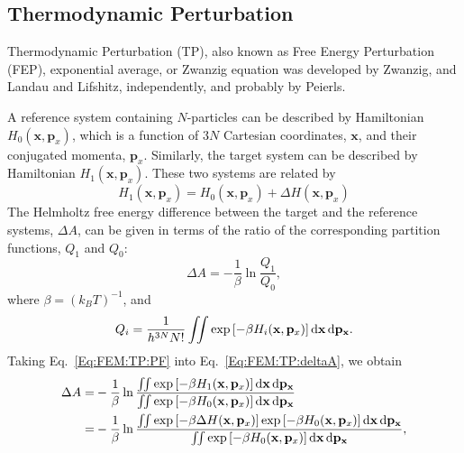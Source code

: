 \subsection{Thermodynamic Perturbation\label{Sec:FEM:TP}}
Thermodynamic Perturbation (TP), also known as Free Energy Perturbation (FEP), exponential average, or Zwanzig equation was developed by Zwanzig,\cite{ZwanzigJCP1954} and Landau and Lifshitz, independently, and probably by Peierls\cite{JorgensenJCTC2008}. 

A reference system containing $N$-particles can be described by Hamiltonian $H_{0}(\mathbf{x},\mathbf{p}_{x})$, which is a function of $3N$ Cartesian coordinates, $\mathbf{x}$, and their conjugated momenta, $\mathbf{p}_{x}$. Similarly, the target system can be described by Hamiltonian $H_{1}(\mathbf{x},\mathbf{p}_{x})$. These two systems are related by 
\begin{equation}
  H_{1}(\mathbf{x},\mathbf{p}_{x}) = H_{0}(\mathbf{x},\mathbf{p}_{x}) + \Delta H (\mathbf{x},\mathbf{p}_{x})
  \label{Eq:FEM:TP:deltaH}
\end{equation}
The Helmholtz free energy difference between the target and the reference systems, $\Delta A$, can be given in terms of the ratio of the corresponding partition functions, $Q_{1}$ and $Q_{0}$:
\begin{equation}
  \Delta A  =  -\frac{1}{\beta}\ln\frac{Q_{1}}{Q_{0}},
  \label{Eq:FEM:TP:deltaA}
\end{equation}
where $\beta = {(k_{B}T)}^{-1}$, and
\begin{equation}
  Q_i = \frac{1}{{h}^{3N}N!} \iint \exp\left[-\beta H_i(\mathbf{x},\mathbf{p}_{x})\right] \mathop{}\!\mathrm{d}\mathbf{x}\mathop{}\!\mathrm{d} \mathbf{p}_\mathbf{x}.
  \label{Eq:FEM:TP:PF}
\end{equation}
Taking Eq.~\ref{Eq:FEM:TP:PF} into Eq.~\ref{Eq:FEM:TP:deltaA}, we obtain
\begin{align}
  \Delta A  =&  -\frac{1}{\beta}\ln{\frac{\iint \exp\left[-\beta H_{1}(\mathbf{x},\mathbf{p}_{x})\right] \diff\mathbf{x}\diff\mathbf{p}_\mathbf{x}}{\iint \exp\left[-\beta H_{0}(\mathbf{x},\mathbf{p}_{x}) \right] \diff\mathbf{x}\diff\mathbf{p}_\mathbf{x}}}\\
            =& -\frac{1}{\beta}\ln{\frac{\iint \exp\left[-\beta \Delta H(\mathbf{x},\mathbf{p}_{x})\right] \exp\left[-\beta H_{0}(\mathbf{x},\mathbf{p}_{x})\right] \diff\mathbf{x}\diff\mathbf{p}_\mathbf{x}}{\iint \exp\left[-\beta H_{0}(\mathbf{x},\mathbf{p}_{x})\right] \diff\mathbf{x}\diff\mathbf{p}_\mathbf{x}}},
  \label{Eq:FEM:TP:deltaA2}
\end{align}
